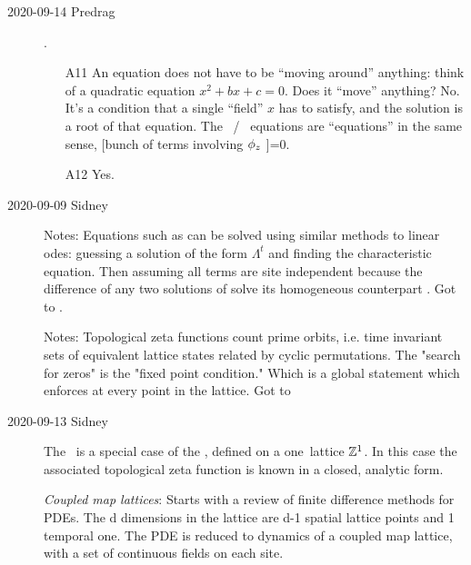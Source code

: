 \begin{description}
\item[2020-09-14 Predrag].
\begin{itemize}
	\item[A11]
An equation does not have to be ``moving around'' anything: think of a
quadratic equation $x^2+bx+c=0$. Does it ``move'' anything? No. It's a condition
that a single ``field'' $x$ has to satisfy, and the solution is a root of that
equation.
The \templatt\ / \catlatt\ equations are ``equations'' in the same sense,
[bunch of terms involving $\phi_z$ ]=0.
	\item[A12]
Yes.
\end{itemize}

\item[2020-09-09 Sidney]
Notes: Equations such as  can be solved using similar methods to linear odes: guessing a solution of the form $\Lambda^t$ and finding the characteristic equation. Then assuming all terms are site independent because the difference of any two solutions of  solve its homogeneous counterpart . Got to .

Notes: Topological zeta functions count prime orbits, i.e. time invariant sets of equivalent lattice states related by cyclic permutations. The "search for zeros"  is the "fixed point condition." Which is a global statement which enforces  at every point in the lattice. Got to 

\item[2020-09-13 Sidney]
The \templatt\ is a special case of the \catlatt, defined on a one\dmn\
lattice $\mathbb{Z}^1$. In this case the associated topological zeta
function is known in a closed, analytic form.

\emph{Coupled map lattices}: Starts with a review of finite difference
methods for PDEs. The d dimensions in the lattice are d-1 spatial lattice
points and 1 temporal one. The PDE is reduced to dynamics of a coupled
map lattice, with a set of continuous fields on each site.


\end{description}
